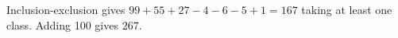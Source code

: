 Inclusion-exclusion gives $99+55+27-4-6-5+1=167$ taking at least one class. Adding 100 gives $\boxed{267}$.
